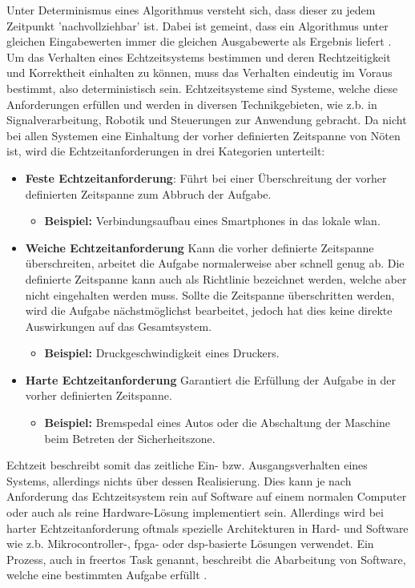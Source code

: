 \documentclass[../EDF Master Thesis.tex]{subfiles}
\begin{document}
Unter Determinismus eines Algorithmus versteht sich, dass dieser zu jedem Zeitpunkt 'nachvollziehbar' ist.
Dabei ist gemeint, dass ein Algorithmus unter gleichen Eingabewerten immer die gleichen Ausgabewerte als Ergebnis liefert \autocite{determinismus}.
Um das Verhalten eines Echtzeitsystems bestimmen und deren Rechtzeitigkeit und Korrektheit einhalten zu können, muss das Verhalten eindeutig im Voraus bestimmt, also deterministisch sein.
    Echtzeitsysteme sind Systeme, welche diese Anforderungen erfüllen und werden in diversen Technikgebieten, wie z.b. in Signalverarbeitung, Robotik und Steuerungen zur Anwendung gebracht.
    Da nicht bei allen Systemen eine Einhaltung der vorher definierten Zeitspanne von Nöten ist, wird die Echtzeitanforderungen in drei Kategorien unterteilt:
    \begin{itemize}
        \item \textbf{Feste Echtzeitanforderung}: Führt bei einer Überschreitung der vorher definierten Zeitspanne zum Abbruch der Aufgabe.
            \begin{itemize}
                \item \textbf{Beispiel:} Verbindungsaufbau eines Smartphones in das lokale \ac{wlan}.
            \end{itemize}
        \item \textbf{Weiche Echtzeitanforderung} Kann die vorher definierte Zeitspanne überschreiten, arbeitet die Aufgabe normalerweise aber schnell genug ab.
            Die definierte Zeitspanne kann auch als Richtlinie bezeichnet werden, welche aber nicht eingehalten werden muss. 
            Sollte die Zeitspanne überschritten werden, wird die Aufgabe nächstmöglichst bearbeitet, jedoch hat dies keine direkte Auswirkungen auf das Gesamtsystem.
            \begin{itemize}
                \item \textbf{Beispiel:} Druckgeschwindigkeit eines Druckers.
            \end{itemize}
        \item \textbf{Harte Echtzeitanforderung} Garantiert die Erfüllung der Aufgabe in der vorher definierten Zeitspanne.
        \begin{itemize}
            \item \textbf{Beispiel:} Bremspedal eines Autos oder die Abschaltung der Maschine beim Betreten der Sicherheitszone.
        \end{itemize}
    \end{itemize}

    \clearpage

    Echtzeit beschreibt somit das zeitliche Ein- bzw. Ausgangsverhalten eines Systems, allerdings nichts über dessen Realisierung.
    Dies kann je nach Anforderung das Echtzeitsystem rein auf Software auf einem normalen Computer oder auch als reine Hardware-Lösung implementiert sein.
    Allerdings wird bei harter Echtzeitanforderung oftmals spezielle Architekturen in Hard- und Software wie z.b. Mikrocontroller-, \ac{fpga}- oder \ac{dsp}-basierte Lösungen verwendet.
    Ein Prozess, auch in \ac{freertos} Task genannt, beschreibt die Abarbeitung von Software, welche eine bestimmten Aufgabe erfüllt \autocite{echtzeit_systeme}.

    \clearpage
\end{document}
